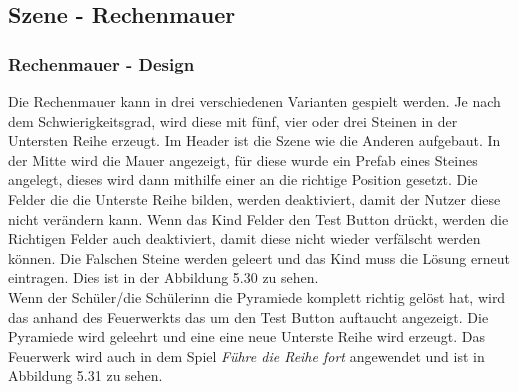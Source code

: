 \subsection{Szene - Rechenmauer}
\subsubsection{Rechenmauer - Design}
Die Rechenmauer kann in drei verschiedenen Varianten gespielt werden. Je nach dem Schwierigkeitsgrad, wird diese mit fünf, vier oder drei Steinen in der Untersten Reihe erzeugt. Im Header ist die Szene wie die Anderen aufgebaut. In der Mitte wird die Mauer angezeigt, für diese wurde ein Prefab eines Steines angelegt, dieses wird dann mithilfe einer  an die richtige Position gesetzt. Die Felder die die Unterste Reihe bilden, werden deaktiviert, damit der Nutzer diese nicht verändern kann. Wenn das Kind Felder den Test Button drückt, werden die Richtigen Felder auch deaktiviert, damit diese nicht wieder verfälscht werden können. Die Falschen Steine werden geleert und das Kind muss die Lösung erneut eintragen. Dies ist in der Abbildung 5.30 zu sehen.\\
Wenn der Schüler/die Schülerinn die Pyramiede komplett richtig gelöst hat, wird das anhand des Feuerwerkts das um den Test Button auftaucht angezeigt. Die Pyramiede wird geleehrt und eine eine neue Unterste Reihe wird erzeugt. Das Feuerwerk wird auch in dem Spiel \textit{Führe die Reihe fort} angewendet und ist in Abbildung 5.31 zu sehen.
